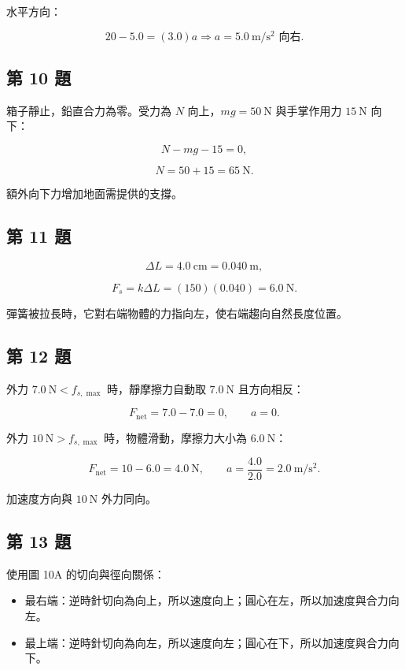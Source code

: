 \documentclass[11pt,a4paper]{article}
\providecommand{\tightlist}{%
  \setlength{\itemsep}{0pt}\setlength{\parskip}{0pt}}
\begin{document}
水平方向：

\[
20-5.0=(3.0)a
\Rightarrow a=5.0\ \mathrm{m/s^2}\text{ 向右}.
\]

\subsection{第 10 題}\label{ux7b2c-10-ux984c}

箱子靜止，鉛直合力為零。受力為 \(N\) 向上，\(mg=50\ \mathrm N\) 與手掌作用力 \(15\ \mathrm N\) 向下：

\[
N-mg-15=0,
\]

\[
N=50+15=65\ \mathrm N.
\]

額外向下力增加地面需提供的支撐。

\subsection{第 11 題}\label{ux7b2c-11-ux984c}

\[
\Delta L=4.0\ \mathrm{cm}=0.040\ \mathrm m,
\]

\[
F_s=k\Delta L=(150)(0.040)=6.0\ \mathrm N.
\]

彈簧被拉長時，它對右端物體的力指向左，使右端趨向自然長度位置。

\subsection{第 12 題}\label{ux7b2c-12-ux984c}

外力 \(7.0\ \mathrm N<f_{s,\max}\) 時，靜摩擦力自動取 \(7.0\ \mathrm N\) 且方向相反：

\[
F_{\mathrm{net}}=7.0-7.0=0,
\qquad a=0.
\]

外力 \(10\ \mathrm N>f_{s,\max}\) 時，物體滑動，摩擦力大小為 \(6.0\ \mathrm N\)：

\[
F_{\mathrm{net}}=10-6.0=4.0\ \mathrm N,
\qquad
a=\frac{4.0}{2.0}=2.0\ \mathrm{m/s^2}.
\]

加速度方向與 \(10\ \mathrm N\) 外力同向。

\subsection{第 13 題}\label{ux7b2c-13-ux984c}

使用圖 10A 的切向與徑向關係：

\begin{itemize}
\tightlist
\item
  最右端：逆時針切向為向上，所以速度向上；圓心在左，所以加速度與合力向左。
\item
  最上端：逆時針切向為向左，所以速度向左；圓心在下，所以加速度與合力向下。
\end{itemize}
\end{document}
